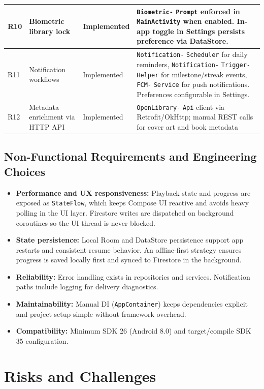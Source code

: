 \documentclass[11pt,a4paper]{article}
\begin{document}
{\begin{longtable}{|p{0.8cm}|>{\RaggedRight}p{4.5cm}|>{\RaggedRight}p{2.5cm}|>{\RaggedRight}p{5.5cm}|}
R10 & Biometric library lock & Implemented & \texttt{Biometric-} \texttt{Prompt} enforced in \texttt{MainActivity} when enabled. In-app toggle in Settings persists preference via DataStore. \\ \hline
R11 & Notification workflows & Implemented & \texttt{Notification-} \texttt{Scheduler} for daily reminders, \texttt{Notification-} \texttt{Trigger-} \texttt{Helper} for milestone/streak events, \texttt{FCM-} \texttt{Service} for push notifications. Preferences configurable in Settings. \\ \hline
R12 & Metadata enrichment via HTTP API & Implemented & \texttt{OpenLibrary-} \texttt{Api} client via Retrofit/OkHttp; manual REST calls for cover art and book metadata \\ \hline
\end{longtable}
}

\subsection{Non-Functional Requirements and Engineering Choices}

\begin{itemize}[noitemsep]
    \item \textbf{Performance and UX responsiveness:} Playback state and progress are exposed as \texttt{StateFlow}, which keeps Compose UI reactive and avoids heavy polling in the UI layer. Firestore writes are dispatched on background coroutines so the UI thread is never blocked.
    \item \textbf{State persistence:} Local Room and DataStore persistence support app restarts and consistent resume behavior. An offline-first strategy ensures progress is saved locally first and synced to Firestore in the background.
    \item \textbf{Reliability:} Error handling exists in repositories and services. Notification paths include logging for delivery diagnostics.
    \item \textbf{Maintainability:} Manual DI (\texttt{AppContainer}) keeps dependencies explicit and project setup simple without framework overhead.
    \item \textbf{Compatibility:} Minimum SDK 26 (Android 8.0) and target/compile SDK 35 configuration.
\end{itemize}

\section{Risks and Challenges}
\end{document}

